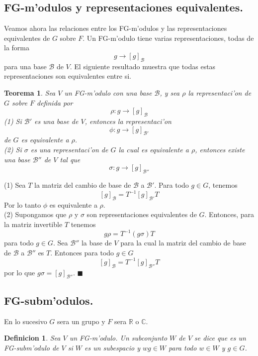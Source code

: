 \documentclass[a4paper,openright,12pt]{book}
\numberwithin{equation}{section} %
\newtheorem{teorema}{Teorema}[section] %
\newtheorem{definicion}{Definicion}[section] %
\newenvironment{proof}{\noindent{\it Demostracion:}}{\hfill$\blacksquare$} %
\begin{document}
\subsection{FG-m'odulos y representaciones equivalentes.}
Veamos ahora las relaciones entre los FG-m'odulos y las representaciones equivalentes de $G$ sobre $F$. Un FG-m'odulo tiene varias representaciones, todas de la forma
\[
g \rightarrow [g]_\mathscr{B}
\]
para una base $\mathscr{B}$ de $V$. El siguiente resultado muestra que todas estas representaciones son equivalentes entre si.
\begin{teorema}
Sea $V$ un FG-m'odulo con una base $\mathscr{B}$, y sea $\rho$ la representaci'on de $G$ sobre $F$ definida por
\[
\rho: g \rightarrow [g]_\mathscr{B}
\]
(1) Si $\mathscr{B}'$ es una base de $V$, entonces la representaci'on
\[
\phi: g \rightarrow [g]_\mathscr{B'}
\]
de $G$ es equivalente a $\rho$.\\
(2) Si $\sigma$ es una representaci'on de $G$ la cual es equivalente a $\rho$, entonces existe una base $\mathscr{B}''$
de $V$ tal que
\[
\sigma: g \rightarrow [g]_\mathscr{B''}
\]
\end{teorema}
\begin{proof}
(1) Sea $T$ la matriz del cambio de base de $\mathscr{B}$ a $\mathscr{B'}$. Para todo $g \in G$, tenemos
\[
[g]_{\mathscr{B}}=T^{-1}[g]_{\mathscr{B'}}T
\]
Por lo tanto $\phi$ es equivalente a $\rho$.\\
(2) Supongamos que $\rho$ y $\sigma$ son representaciones equivalentes de $G$. Entonces, para la matriz invertible $T$ tenemos
\[
g\rho = T^{-1}(g \sigma )T
\]
para todo $g \in G$. Sea $\mathscr{B''}$ la base de $V$ para la cual la matriz del cambio de base de $\mathscr{B}$ a $\mathscr{B''}$ es $T$. Entonces para todo $g \in G$
\[
[g]_{\mathscr{B}}=T^{-1}[g]_{\mathscr{B''}}T
\]
por lo que $g \sigma = [g]_\mathscr{B''}$.
\end{proof}
\subsection{FG-subm'odulos.}
En lo sucesivo $G$ sera un grupo y $F$ sera $\mathbb{R}$ o $\mathbb{C}$.
\begin{definicion}
Sea $V$ un FG-m'odulo. Un subconjunto $W$ de $V$ se dice que es un FG-subm'odulo de $V$ si $W$ es un subespacio y $wg \in W$ para todo $w \in W$ y $g \in G$. 
\end{definicion}
\end{document}
